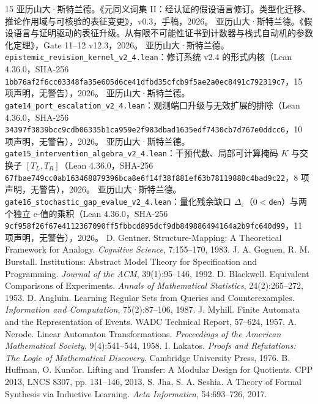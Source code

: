 \documentclass[11pt,a4paper,UTF8,fontset=fandol]{ctexart}
\DeclareRobustCommand{\id}[1]{\nolinkurl{#1}}
\begin{document}
\sloppy
\begin{thebibliography}{15}
 亚历山大·斯特兰德。《元同义词集 II：经认证的假设语言修订。类型化迁移、推论作用域与可核验的表征变更》，v0.3，手稿，2026。
 亚历山大·斯特兰德。《假设语言与证明驱动的表征升级。从有限不可能性证书到计数器与栈式自动机的参数化定理》，Gate 11–12 v12.3，2026。
 亚历山大·斯特兰德。\id{epistemic_revision_kernel_v2_4.lean}：修订系统 v2.4 的形式内核（Lean 4.36.0，SHA-256 \id{1bb76af2f6cc03348fa35e605d6ce41dfbd35cfcb9f5ae2a0ec8491c792319c7}，15 项声明，无警告），2026。
 亚历山大·斯特兰德。\id{gate14_port_escalation_v2_4.lean}：观测端口升级与无效扩展的排除（Lean 4.36.0，SHA-256 \id{34397f3839bcc9cdb06335b1ca959e2f983dbad1635edf7430cb7d767e0ddcc6}，10 项声明，无警告），2026。
 亚历山大·斯特兰德。\id{gate15_intervention_algebra_v2_4.lean}：干预代数、局部可计算掩码 $K$ 与交换子 $[T_L,T_R]$（Lean 4.36.0，SHA-256 \id{67fbae749cc0ab163468879396bca8e6f14f38f881ef63b78119888c4bad9c22}，8 项声明，无警告），2026。
 亚历山大·斯特兰德。\id{gate16_stochastic_gap_evalue_v2_4.lean}：量化残余缺口 $\Delta_\varepsilon$（$0<\mathsf{den}$）与两个独立 e-值的乘积（Lean 4.36.0，SHA-256 \id{9cf958f26f67e4112367090ff5fbbcd895dcf9db849886494164a2b9fc640d99}，11 项声明，无警告），2026。
 D. Gentner. Structure-Mapping: A Theoretical Framework for Analogy. \emph{Cognitive Science}, 7:155–170, 1983.
 J. A. Goguen, R. M. Burstall. Institutions: Abstract Model Theory for Specification and Programming. \emph{Journal of the ACM}, 39(1):95–146, 1992.
 D. Blackwell. Equivalent Comparisons of Experiments. \emph{Annals of Mathematical Statistics}, 24(2):265–272, 1953.
 D. Angluin. Learning Regular Sets from Queries and Counterexamples. \emph{Information and Computation}, 75(2):87–106, 1987.
 J. Myhill. Finite Automata and the Representation of Events. WADC Technical Report, 57–624, 1957.
 A. Nerode. Linear Automaton Transformations. \emph{Proceedings of the American Mathematical Society}, 9(4):541–544, 1958.
 I. Lakatos. \emph{Proofs and Refutations: The Logic of Mathematical Discovery}. Cambridge University Press, 1976.
 B. Huffman, O. Kunčar. Lifting and Transfer: A Modular Design for Quotients. CPP 2013, LNCS 8307, pp. 131–146, 2013.
 S. Jha, S. A. Seshia. A Theory of Formal Synthesis via Inductive Learning. \emph{Acta Informatica}, 54:693–726, 2017.
\end{thebibliography}
\end{document}
